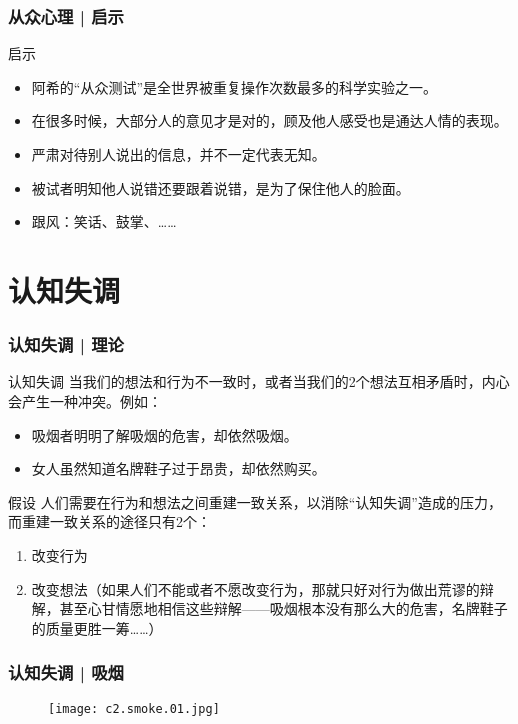 \begin{frame}
  \frametitle{从众心理 | 启示}
  \begin{block}{启示}
    \begin{itemize}
      \item 阿希的“从众测试”是全世界被重复操作次数最多的科学实验之一。
      \item 在很多时候，大部分人的意见才是对的，顾及他人感受也是通达人情的表现。
      \item 严肃对待别人说出的信息，并不一定代表无知。
      \item 被试者明知他人说错还要跟着说错，是为了保住他人的脸面。
      \item 跟风：笑话、鼓掌、……
    \end{itemize}
  \end{block}
\end{frame}

\section{认知失调}
\begin{frame}
  \frametitle{认知失调 | 理论}
  \begin{block}{认知失调}
    当我们的想法和行为不一致时，或者当我们的2个想法互相矛盾时，内心会产生一种冲突。例如：
    \begin{itemize}
      \item 吸烟者明明了解吸烟的危害，却依然吸烟。
      \item 女人虽然知道名牌鞋子过于昂贵，却依然购买。
    \end{itemize}
  \end{block}
  \pause
  \begin{block}{假设}
    人们需要在行为和想法之间重建一致关系，以消除“认知失调”造成的压力，而重建一致关系的途径只有2个：
    \begin{enumerate}
      \item 改变行为
      \item 改变想法（如果人们不能或者不愿改变行为，那就只好对行为做出荒谬的辩解，甚至心甘情愿地相信这些辩解——吸烟根本没有那么大的危害，名牌鞋子的质量更胜一筹……）
    \end{enumerate}
  \end{block}
\end{frame}

\begin{frame}
  \frametitle{认知失调 | 吸烟}
  \begin{figure}
    \centering
    \texttt{[image: c2.smoke.01.jpg]}
  \end{figure}
\end{frame}

